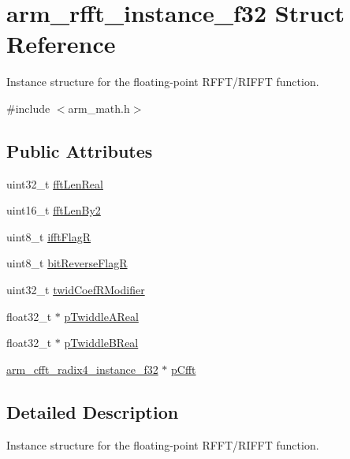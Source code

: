 \hypertarget{structarm__rfft__instance__f32}{\section{arm\-\_\-rfft\-\_\-instance\-\_\-f32 Struct Reference}
\label{structarm__rfft__instance__f32}
}


Instance structure for the floating-\/point R\-F\-F\-T/\-R\-I\-F\-F\-T function.  




{\ttfamily \#include $<$arm\-\_\-math.\-h$>$}

\subsection*{Public Attributes}
\begin{DoxyCompactItemize}
\item 
uint32\-\_\-t \hyperlink{structarm__rfft__instance__f32_a4219d4669699e4efdcb150ed7a0d9a57}{fft\-Len\-Real}
\item 
uint16\-\_\-t \hyperlink{structarm__rfft__instance__f32_a075076e07ebb8521d8e3b49a31db6c57}{fft\-Len\-By2}
\item 
uint8\-\_\-t \hyperlink{structarm__rfft__instance__f32_a5ee6d10a934ab4b666e0bb286c3d633f}{ifft\-Flag\-R}
\item 
uint8\-\_\-t \hyperlink{structarm__rfft__instance__f32_ac342f3248157cbbd2f04a3c8ec9fc9eb}{bit\-Reverse\-Flag\-R}
\item 
uint32\-\_\-t \hyperlink{structarm__rfft__instance__f32_aede85350fb5ae6baa1b3e8bfa15b18d6}{twid\-Coef\-R\-Modifier}
\item 
float32\-\_\-t $\ast$ \hyperlink{structarm__rfft__instance__f32_a534cc7e6e9b3e3dd022fad611c762142}{p\-Twiddle\-A\-Real}
\item 
float32\-\_\-t $\ast$ \hyperlink{structarm__rfft__instance__f32_a23543ecfd027fea2477fe1eea23c3c4d}{p\-Twiddle\-B\-Real}
\item 
\hyperlink{structarm__cfft__radix4__instance__f32}{arm\-\_\-cfft\-\_\-radix4\-\_\-instance\-\_\-f32} $\ast$ \hyperlink{structarm__rfft__instance__f32_a9f47ba9f50c81e4445ae3827b981bc05}{p\-Cfft}
\end{DoxyCompactItemize}


\subsection{Detailed Description}
Instance structure for the floating-\/point R\-F\-F\-T/\-R\-I\-F\-F\-T function. 

